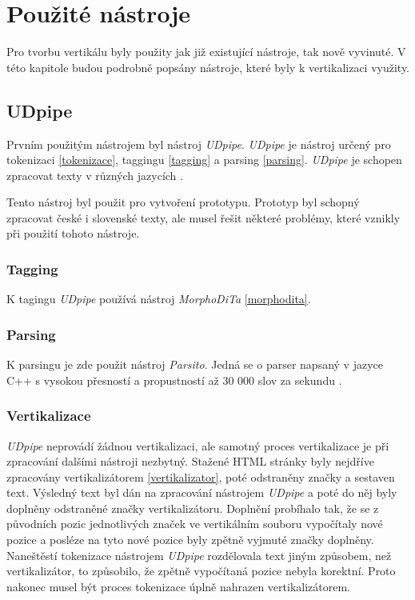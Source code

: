 \section{Použité nástroje}
Pro tvorbu vertikálu byly použity jak již existující nástroje, tak nově vyvinuté. V této kapitole
budou podrobně popsány nástroje, které byly k vertikalizaci využity.

\subsection{UDpipe}
Prvním použitým nástrojem byl nástroj \textit{UDpipe}. \textit{UDpipe} je nástroj určený pro tokenizaci \ref{tokenizace},
taggingu \ref{tagging} a parsing \ref{parsing}. \textit{UDpipe} je schopen zpracovat texty v různých jazycích \cite{UDPIPE}.

Tento nástroj byl použit pro vytvoření prototypu. Prototyp byl schopný zpracovat české i slovenské texty, ale musel
řešit některé problémy, které vznikly při použití tohoto nástroje.

\subsubsection{Tagging}
K tagingu \textit{UDpipe} používá nástroj \textit{MorphoDiTa} \ref{morphodita}.

\subsubsection{Parsing}
K parsingu je zde použit nástroj \textit{Parsito}. Jedná se o parser napsaný v jazyce C++ s vysokou přesností
a propustností až 30 000 slov za sekundu \cite{PARSITO}.

\subsubsection{Vertikalizace}
\textit{UDpipe} neprovádí žádnou vertikalizaci, ale samotný proces vertikalizace je při zpracování dalšími nástroji
nezbytný. Stažené HTML stránky byly nejdříve zpracovány vertikalizátorem \ref{vertikalizator}, poté odstraněny
značky a sestaven text. Výsledný text byl dán na zpracování nástrojem \textit{UDpipe} a poté do něj byly doplněny
odstraněné značky vertikalizátoru. Doplnění probíhalo tak, že se z původních pozic jednotlivých značek ve vertikálním
souboru vypočítaly nové pozice a posléze na tyto nové pozice byly zpětně vyjmuté značky doplněny. Naneštěstí tokenizace nástrojem \textit{UDpipe} rozdělovala text
jiným způsobem, než vertikalizátor, to způsobilo, že zpětně vypočítaná pozice nebyla korektní. Proto nakonec musel být
proces tokenizace úplně nahrazen vertikalizátorem.

